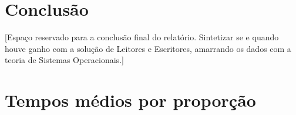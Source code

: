 \documentclass[11pt, a4paper]{article}
\begin{document}
\section{Conclusão}
[Espaço reservado para a conclusão final do relatório. Sintetizar se e quando houve ganho com a solução de Leitores e Escritores, amarrando os dados com a teoria de Sistemas Operacionais.]

\appendix
\section{Tempos médios por proporção}
\end{document}

